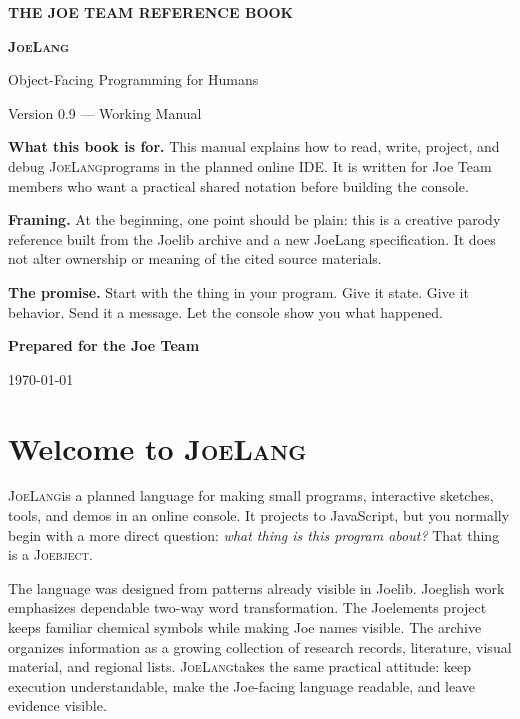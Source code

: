 \documentclass[12pt]{article}
\newcommand{\JoeLang}{\textsc{JoeLang}}
\newcommand{\Joebject}{\textsc{Joebject}}
\begin{document}
\begin{titlepage}
\centering
{\Large\bfseries THE JOE TEAM REFERENCE BOOK\par}
\vspace{1.1cm}
{\huge\bfseries \JoeLang\par}
\vspace{0.35cm}
{\Large Object-Facing Programming for Humans\par}
\vspace{0.8cm}
{\large Version 0.9 --- Working Manual\par}
\vfill
\begin{minipage}{0.86\textwidth}
\small
\textbf{What this book is for.} This manual explains how to read, write, project, and debug \JoeLang programs in the planned online IDE. It is written for Joe Team members who want a practical shared notation before building the console.

\vspace{0.6em}
\textbf{Framing.} At the beginning, one point should be plain: this is a creative parody reference built from the Joelib archive and a new JoeLang specification. It does not alter ownership or meaning of the cited source materials.

\vspace{0.6em}
\textbf{The promise.} Start with the thing in your program. Give it state. Give it behavior. Send it a message. Let the console show you what happened.
\end{minipage}
\vfill
\textbf{Prepared for the Joe Team}\par
\today
\end{titlepage}

\tableofcontents
\clearpage

\section{Welcome to \JoeLang}
\JoeLang is a planned language for making small programs, interactive sketches, tools, and demos in an online console. It projects to JavaScript, but you normally begin with a more direct question: \emph{what thing is this program about?} That thing is a \Joebject.

The language was designed from patterns already visible in Joelib. Joeglish work emphasizes dependable two-way word transformation. The Joelements project keeps familiar chemical symbols while making Joe names visible. The archive organizes information as a growing collection of research records, literature, visual material, and regional lists.\cite{translatorReadme,joelements,joelibReadme} \JoeLang takes the same practical attitude: keep execution understandable, make the Joe-facing language readable, and leave evidence visible.
\end{document}
